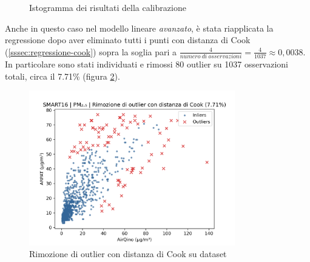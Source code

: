 \begin{figure}[H]%
    \centering
    \captionsetup{justification=centering}
    \caption{Istogramma dei risultati della calibrazione }%
    \label{fig:risultati-pm2.5-hist}%
\end{figure}

\clearpage

Anche in questo caso nel modello lineare \textit{avanzato}, è stata riapplicata la regressione dopo aver eliminato tutti i punti con distanza di Cook (\ref{sssec:regressione-cook}) sopra la soglia pari a $\frac{4}{numero\ di\ osservazioni} = \frac{4}{1037} \approx 0,0038$. In particolare sono stati individuati e rimossi 80 outlier su 1037 osservazioni totali, circa il 7.71\% (figura \ref{fig:cook-pm2.5}).

\begin{figure}[H]
\centering
\includegraphics[width=0.80\textwidth,height=\textheight,keepaspectratio]{img/cook_pm2.5.png}
\caption{Rimozione di outlier con distanza di Cook su dataset }%
\label{fig:cook-pm2.5}%
\end{figure}

